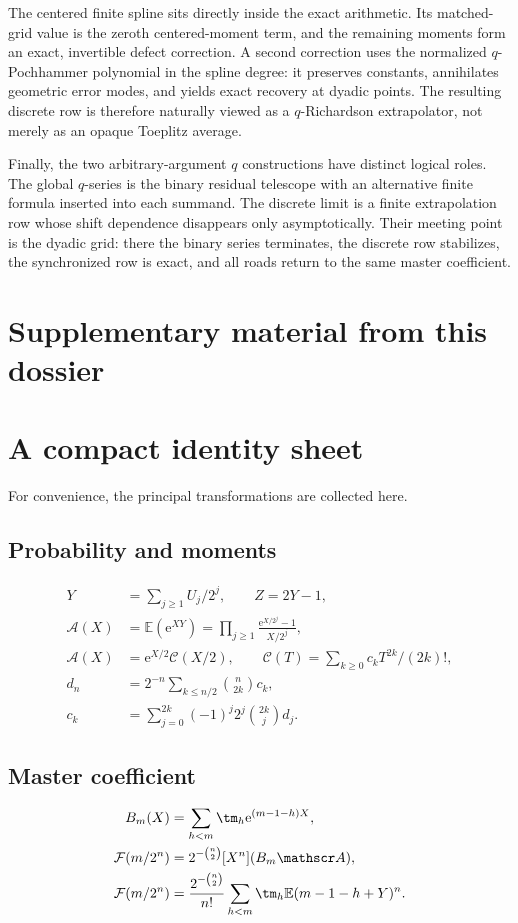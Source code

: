\documentclass[11pt,oneside]{article}
\theoremstyle{definition}
\theoremstyle{remark}
\newcommand{\e}{\mathrm e}
\newcommand{\E}{\mathbb E}
\begin{document}
The centered finite spline sits directly inside the exact arithmetic.  Its matched-grid value
is the zeroth centered-moment term, and the remaining moments form an exact, invertible defect
correction.  A second correction uses the normalized $q$-Pochhammer polynomial in the spline
degree: it preserves constants, annihilates geometric error modes, and yields exact recovery
at dyadic points.  The resulting discrete row is therefore naturally viewed as a
$q$-Richardson extrapolator, not merely as an opaque Toeplitz average.

Finally, the two arbitrary-argument $q$ constructions have distinct logical roles.  The global
$q$-series is the binary residual telescope with an alternative finite formula inserted into
each summand.  The discrete limit is a finite extrapolation row whose shift dependence
disappears only asymptotically.  Their meeting point is the dyadic grid: there the binary
series terminates, the discrete row stabilizes, the synchronized row is exact, and all roads
return to the same master coefficient.

\clearpage
\section*{Supplementary material from this dossier}
\section{A compact identity sheet}
\label{dyadicweb:app:identity-sheet}

For convenience, the principal transformations are collected here.

\subsection*{Probability and moments}
\begin{align*}
 Y&=\sum_{j\ge1}U_j/2^j,\qquad Z=2Y-1,\\
 \mathscr A(X)&=\E(\e^{XY})=\prod_{j\ge1}\frac{\e^{X/2^j}-1}{X/2^j},\\
 \mathscr A(X)&=\e^{X/2}\mathscr C(X/2),\qquad
 \mathscr C(T)=\sum_{k\ge0}c_kT^{2k}/(2k)!,\\
 d_n&=2^{-n}\sum_{k\le n/2}\binom n{2k}c_k,\\
 c_k&=\sum_{j=0}^{2k}(-1)^j2^j\binom{2k}{j}d_j.
\end{align*}

\subsection*{Master coefficient}
\begin{align*}
 B_m(X)&=\sum_{h<m}\tm_h\e^{(m-1-h)X},\\
 \mathcal F(m/2^n)&=2^{-\binom n2}[X^n](B_m\mathscr A),\\
 \mathcal F(m/2^n)&=\frac{2^{-\binom n2}}{n!}
   \sum_{h<m}\tm_h\E(m-1-h+Y)^n.
\end{align*}
\end{document}
